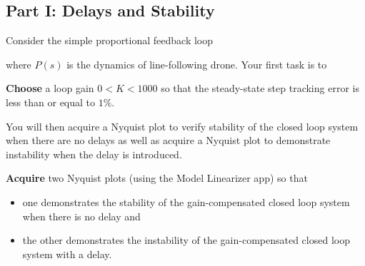 \subsection{Part I: Delays and Stability}
Consider the simple proportional feedback loop
%
\begin{center}
\end{center}
where \(P(s)\) is the dynamics of line-following drone.
Your first task is to
%
\begin{deliverable}[label={del:lab5:p1:1}]
  \textbf{Choose} a loop gain \(0 < K < 1000\) so that the steady-state step tracking error is less than or equal to \(1\%.\)
\end{deliverable}
%
You will then acquire a Nyquist plot to verify stability of the closed loop system when there are no delays as well as acquire a Nyquist plot to demonstrate instability when the delay is introduced.
%
\begin{deliverable}[label={del:lab5:p1:2}]
  \textbf{Acquire} two Nyquist plots (using the Model Linearizer app) so that
  \begin{itemize}
    \item{one demonstrates the stability of the gain-compensated closed loop system when there is no delay and}
    \item{the other demonstrates the instability of the gain-compensated closed loop system with a delay.}
  \end{itemize}
\end{deliverable}
